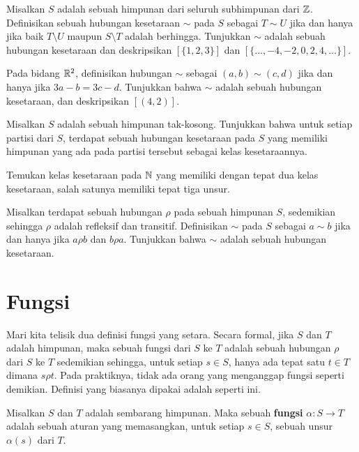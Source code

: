 \begin{exc}
Misalkan $S$ adalah sebuah himpunan dari seluruh subhimpunan dari $\mathbb{Z}$. Definisikan sebuah hubungan kesetaraan $\sim$ pada $S$ sebagai $T \sim U$ jika dan hanya jika baik $T\setminus U$ maupun $S \setminus T$ adalah berhingga. Tunjukkan $\sim$ adalah sebuah hubungan kesetaraan dan deskripsikan $[\{1, 2, 3\}]$ dan $ [\{..., -4, -2, 0, 2, 4, ...\}] $.
\end{exc}

\begin{exc}
Pada bidang $\mathbb{R}^2$, definisikan hubungan $\sim$ sebagai $(a,b) \sim (c,d)$ jika dan hanya jika $3a - b = 3c - d$. Tunjukkan bahwa $\sim$ adalah sebuah hubungan kesetaraan, dan deskripsikan $[(4,2)]$.
\end{exc}

\begin{exc}
Misalkan $S$ adalah sebuah himpunan tak-kosong. Tunjukkan bahwa untuk setiap partisi dari $S$, terdapat sebuah hubungan kesetaraan pada $S$ yang memiliki himpunan yang ada pada partisi tersebut sebagai kelas kesetaraannya.
\end{exc}

\begin{exc}
Temukan kelas kesetaraan pada $\mathbb{N}$ yang memiliki dengan tepat dua kelas kesetaraan, salah satunya memiliki tepat tiga unsur.
\end{exc}

\begin{exc}
Misalkan terdapat sebuah hubungan $\rho$ pada sebuah himpunan $S$, sedemikian sehingga $\rho$ adalah refleksif dan transitif. Definisikan $\sim$ pada $S$ sebagai $a \sim b$ jika dan hanya jika $a \rho b$ dan $b \rho a$. Tunjukkan bahwa $\sim$ adalah sebuah hubungan kesetaraan.
\end{exc}


\section{Fungsi}

Mari kita telisik dua definisi fungsi yang setara. Secara formal, jika $S$ dan $T$ adalah himpunan, maka sebuah fungsi dari $S$ ke $T$ adalah sebuah hubungan $\rho$ dari $S$ ke $T$ sedemikian sehingga, untuk setiap $s \in S$, hanya ada tepat satu $t \in T$ dimana $s \rho t$. Pada praktiknya, tidak ada orang yang menganggap fungsi seperti demikian. Definisi yang biasanya dipakai adalah seperti ini.

\begin{defn}
Misalkan $S$ dan $T$ adalah sembarang himpunan. Maka sebuah \textbf{fungsi} $\alpha : S \rightarrow T$ adalah sebuah aturan yang memasangkan, untuk setiap $s\in S$, sebuah unsur $\alpha(s)$ dari $T$.
\end{defn}


